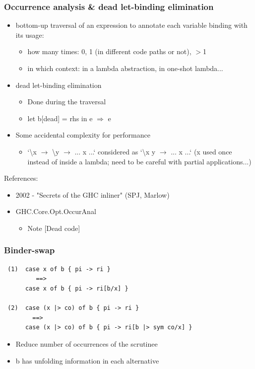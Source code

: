 \documentclass[aspectratio=169]{beamer}
\begin{document}
\begin{frame}
  \frametitle{Occurrence analysis \& dead let-binding elimination}

  \begin{itemize}
    \item bottom-up traversal of an expression to annotate each variable binding
      with its usage:
      \begin{itemize}
        \item how many times: 0, 1 (in different code paths or not), $>$1
        \item in which context: in a lambda abstraction, in one-shot lambda...
      \end{itemize}
    \item dead let-binding elimination
      \begin{itemize}
        \item Done during the traversal
        \item let b[dead] = rhs in e $\Longrightarrow$ e
      \end{itemize}
    \item Some accidental complexity for performance
      \begin{itemize}
        \item `\textbackslash x $\rightarrow$ \textbackslash y $\rightarrow$
          ... x ...` considered as `\textbackslash x y $\rightarrow$ ... x
          ...` (x used once instead of inside a lambda; need to be careful with
          partial applications...)
      \end{itemize}
  \end{itemize}

  References:
  \begin{itemize}
    \item 2002 - "Secrets of the GHC inliner" (SPJ, Marlow)
    \item GHC.Core.Opt.OccurAnal
      \begin{itemize}
        \item Note [Dead code]
      \end{itemize}
  \end{itemize}

\end{frame}

\begin{frame}[fragile]
  \frametitle{Binder-swap}
\begin{lstlisting}
 (1)  case x of b { pi -> ri }
         ==>
      case x of b { pi -> ri[b/x] }

 (2)  case (x |> co) of b { pi -> ri }
        ==>
      case (x |> co) of b { pi -> ri[b |> sym co/x] }
\end{lstlisting}
  \begin{itemize}
    \item Reduce number of occurrences of the scrutinee
    \item b has unfolding information in each alternative
  \end{itemize}
\end{frame}
\end{document}
